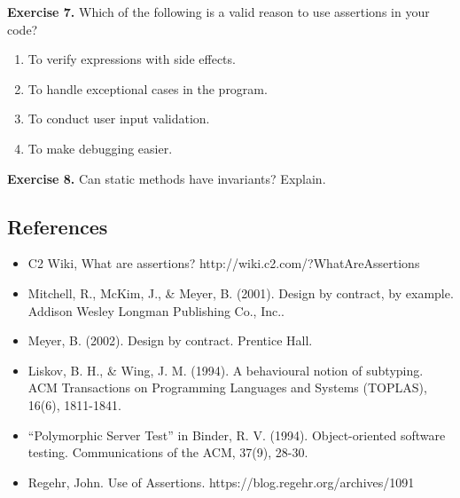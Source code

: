 \textbf{Exercise 7.} Which of the following is a valid reason to use
assertions in your code?

\begin{enumerate}
\def\labelenumi{\arabic{enumi}.}
\tightlist
\item
  To verify expressions with side effects.
\item
  To handle exceptional cases in the program.
\item
  To conduct user input validation.
\item
  To make debugging easier.
\end{enumerate}

\textbf{Exercise 8.} Can static methods have invariants? Explain.

\hypertarget{references}{%
\subsection{References}\label{references}}

\begin{itemize}
\item
  C2 Wiki, What are assertions? http://wiki.c2.com/?WhatAreAssertions
\item
  Mitchell, R., McKim, J., \& Meyer, B. (2001). Design by contract, by
  example. Addison Wesley Longman Publishing Co., Inc..
\item
  Meyer, B. (2002). Design by contract. Prentice Hall.
\item
  Liskov, B. H., \& Wing, J. M. (1994). A behavioural notion of
  subtyping. ACM Transactions on Programming Languages and Systems
  (TOPLAS), 16(6), 1811-1841.
\item
  ``Polymorphic Server Test'' in Binder, R. V. (1994). Object-oriented
  software testing. Communications of the ACM, 37(9), 28-30.
\item
  Regehr, John. Use of Assertions. https://blog.regehr.org/archives/1091
\end{itemize}
